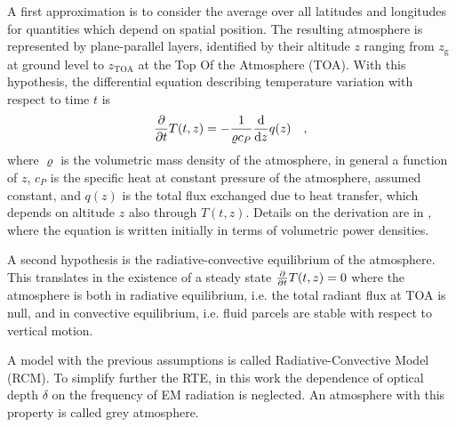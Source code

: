 \documentclass[a4paper,10pt,twocolumn,\classoptions]{article}
\newcommand{\zTOA}{z_\text{TOA}}
\begin{document}
A first approximation is to consider the average over all latitudes and longitudes for quantities which depend on spatial position. The resulting atmosphere is represented by plane-parallel layers, identified by their altitude $z$ ranging from $z_\text{g}$ at ground level to $\zTOA$ at the Top Of the Atmosphere (TOA). With this hypothesis, the differential equation describing temperature variation with respect to time $t$ is
\begin{equation}
  \label{eq:temperature_derivation}
  \pdv*{T(t,z)}{t} = -\frac{1}{\varrho c_P} \odv*{q(z)}{z}
  \quad ,
\end{equation}
where $\varrho$ is the volumetric mass density of the atmosphere, in general a function of $z$, $c_P$ is the specific heat at constant pressure of the atmosphere, assumed constant, and $q(z)$ is the total flux exchanged due to heat transfer, which depends on altitude $z$ also through $T(t,z)$. Details on the derivation are in \cite[466]{Ramanathan}, where the equation is written initially in terms of volumetric power densities.

A second hypothesis is the radiative-convective equilibrium of the atmosphere. This translates in the existence of a steady state $\pdv*{T(t,z)}{t} = 0$ where the atmosphere is both in radiative equilibrium, i.e. the total radiant flux at TOA is null, and in convective equilibrium, i.e. fluid parcels are stable with respect to vertical motion.

A model with the previous assumptions is called Radiative-Convective Model (RCM).
To simplify further the RTE, in this work the dependence of optical depth $\delta$ on the frequency of EM radiation is neglected. An atmosphere with this property is called grey atmosphere.
\end{document}
